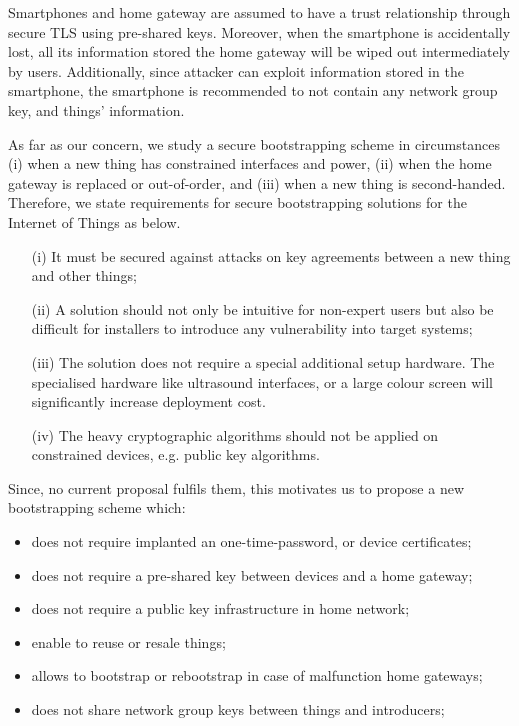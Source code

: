 Smartphones and home gateway are assumed to have a trust relationship through secure TLS using pre-shared keys. Moreover, when the smartphone is accidentally lost, all its information stored the home gateway will be wiped out intermediately by users. Additionally, since attacker can exploit information stored in the smartphone, the smartphone is recommended to not contain any network group key, and things' information. 

As far as our concern, we study a secure bootstrapping scheme in circumstances (i) when a new thing has constrained interfaces and power, (ii) when the home gateway is replaced or out-of-order, and (iii) when a new thing is second-handed. Therefore, we state requirements for secure bootstrapping solutions for the Internet of Things as below.
\begin{enumerate}
\item [(i)] It must be secured against attacks on key agreements between a new thing and other things;
\item [(ii)] A solution should not only be intuitive for non-expert users but also be difficult for installers to introduce any vulnerability into target systems; 
\item [(iii)] The solution does not require a special additional setup hardware. The specialised hardware like ultrasound interfaces, or a large colour screen will significantly increase deployment cost. 
\item[(iv)] The heavy cryptographic algorithms should not be applied on constrained devices, e.g. public key algorithms. 
\end{enumerate} 

Since, no current proposal fulfils them, this motivates us to propose a new bootstrapping scheme which: 
\begin{itemize}
\item does not require implanted an one-time-password, or device certificates;
\item does not require a pre-shared key between devices and a home gateway;
\item does not require a public key infrastructure in home network;
\item enable to reuse or resale things; 
\item allows to bootstrap or rebootstrap in case of malfunction home gateways;
\item does not share network group keys between things and introducers;
\end{itemize}


